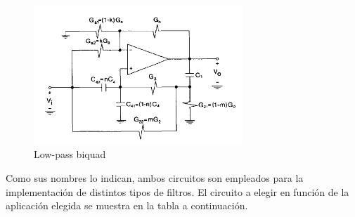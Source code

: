 \begin{figure}[H] 
    \centering
    \includegraphics[width=0.7\textwidth]{../EJ3/Resources/LPB.png}
    \caption{Low-pass biquad}
    \label{EJ3_LPB}
\end{figure}

Como sus nombres lo indican, ambos circuitos son empleados para la implementaci\'on de distintos tipos de filtros. El circuito a elegir en funci\'on de la aplicaci\'on elegida se muestra en la tabla a continuaci\'on.